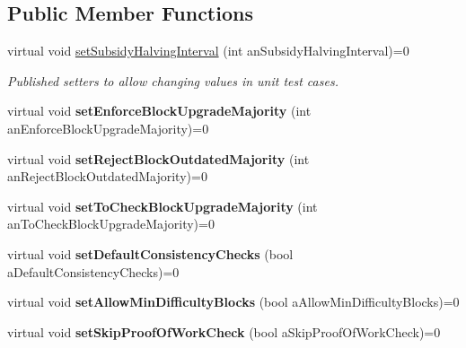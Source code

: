 \subsection*{Public Member Functions}
\begin{DoxyCompactItemize}
\item 
\mbox{\label{class_c_modifiable_params_a267a442c10bffd3374c144a3b7f85109}} 
virtual void \mbox{\hyperlink{class_c_modifiable_params_a267a442c10bffd3374c144a3b7f85109}{set\+Subsidy\+Halving\+Interval}} (int an\+Subsidy\+Halving\+Interval)=0
\begin{DoxyCompactList}\small\item\em Published setters to allow changing values in unit test cases. \end{DoxyCompactList}\item 
\mbox{\label{class_c_modifiable_params_a314983948c2d20ec49988d7e3753d9a9}} 
virtual void {\bfseries set\+Enforce\+Block\+Upgrade\+Majority} (int an\+Enforce\+Block\+Upgrade\+Majority)=0
\item 
\mbox{\label{class_c_modifiable_params_ad0124c5aff51dbe59a2d7be188b704d3}} 
virtual void {\bfseries set\+Reject\+Block\+Outdated\+Majority} (int an\+Reject\+Block\+Outdated\+Majority)=0
\item 
\mbox{\label{class_c_modifiable_params_a27b175029965519f85c8d8ec97f21935}} 
virtual void {\bfseries set\+To\+Check\+Block\+Upgrade\+Majority} (int an\+To\+Check\+Block\+Upgrade\+Majority)=0
\item 
\mbox{\label{class_c_modifiable_params_a693968c09f6220f7e7f76f5e21a7b18a}} 
virtual void {\bfseries set\+Default\+Consistency\+Checks} (bool a\+Default\+Consistency\+Checks)=0
\item 
\mbox{\label{class_c_modifiable_params_a6d2962f388f0b018e3d25db7cab5d94b}} 
virtual void {\bfseries set\+Allow\+Min\+Difficulty\+Blocks} (bool a\+Allow\+Min\+Difficulty\+Blocks)=0
\item 
\mbox{\label{class_c_modifiable_params_af9538f7ede9274968922f1cc019df0a2}} 
virtual void {\bfseries set\+Skip\+Proof\+Of\+Work\+Check} (bool a\+Skip\+Proof\+Of\+Work\+Check)=0
\end{DoxyCompactItemize}


